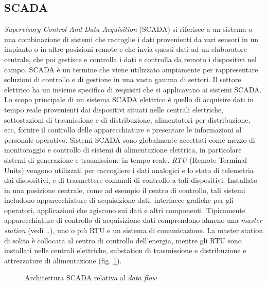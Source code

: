 \subsection{SCADA}
\emph{Supervisory Control And Data Acquisition} (SCADA) si riferisce a un sistema o una combinazione di sistemi che raccoglie i dati provenienti da vari sensori in un impianto o in altre posizioni remote e che invia questi dati ad un elaboratore centrale, che poi gestisce e controlla i dati e controlla da remoto i dispositivi nel campo. SCADA è un termine che viene utilizzato ampiamente per rappresentare soluzioni di controllo e di gestione in una vasta gamma di settori. Il settore elettrico ha un insieme specifico di requisiti che si applicavano ai sistemi SCADA. Lo scopo principale di un sistema SCADA elettrico è quello di acquisire dati in tempo reale provenienti dai dispositivi situati nelle centrali elettriche, sottostazioni di trasmissione e di distribuzione, alimentatori per distribuzione, ecc, fornire il controllo delle apparecchiature e presentare le informazioni al personale operativo.  
\newline
Sistemi SCADA sono globalmente accettati come mezzo di monitoraggio e controllo di sistemi di alimentazione elettrica, in particolare sistemi di generazione e trasmissione in tempo reale. \emph{RTU} (Remote Terminal Units) vengono utilizzati per raccogliere i dati analogici e lo stato di telemetria dai dispositivi, e di trasmettere comandi di controllo a tali dispositivi. Installato in una posizione centrale, come ad esempio il centro di controllo, tali sistemi includono apparecchiature di acquisizione dati, interfacce grafiche per gli operatori, applicazioni che agiscono sui dati e altri componenti. 
\newline
Tipicamente apparecchiature di controllo di acquisizione dati comprendono almeno una \emph{master station} (vedi ..), uno o più RTU e un sistema di comunicazione. La master station di solito è collocata al centro di controllo dell'energia, mentre gli RTU sono installati nelle centrali elettriche, substation di trasmissione e distribuzione e attrezzature di alimentazione (fig. \ref{fig:4}).

\begin{figure}[h] 
\caption{Architettura SCADA relativa al \emph{data flow}}\label{fig:4}
\end{figure}



